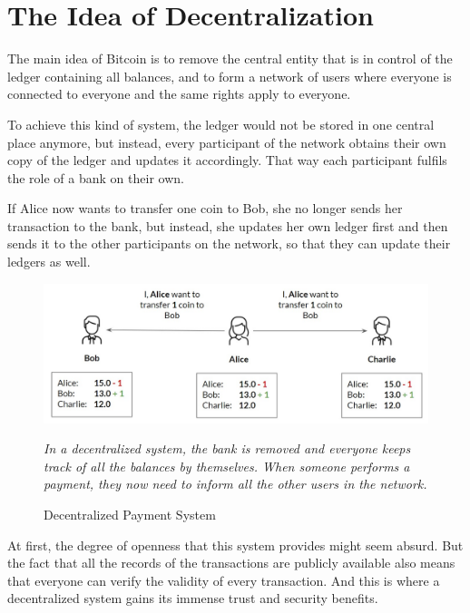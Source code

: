 \documentclass[a4paper, 12pt]{report}
\begin{document}
\section{The Idea of Decentralization}

\par The main idea of Bitcoin is to remove the central entity that is in control of the ledger containing all balances, and to form a network of users where everyone is connected to everyone and the same rights apply to everyone.

\par To achieve this kind of system, the ledger would not be stored in one central place anymore, but instead, every participant of the network obtains their own copy of the ledger and updates it accordingly. That way each participant fulfils the role of a bank on their own.

\par If Alice now wants to transfer one coin to Bob, she no longer sends her transaction to the bank, but instead, she updates her own ledger first and then sends it to the other participants on the network, so that they can update their ledgers as well.

\begin{figure}[h]
	\includegraphics[width=\textwidth]{02_Naive_System}
	\caption{Decentralized Payment System}
	\medskip
	\small \textit{In a decentralized system, the bank is removed and everyone keeps track of all the balances by themselves. When someone performs a payment, they now need to inform all the other users in the network.}
	\label{fig:02_Naive_System}
\end{figure}

\par At first, the degree of openness that this system provides might seem absurd. But the fact that all the records of the transactions are publicly available also means that everyone can verify the validity of every transaction. And this is where a decentralized system gains its immense trust and security benefits.
\end{document}
